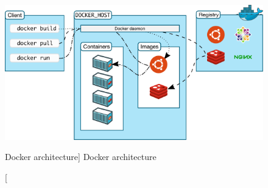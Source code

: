 \begin{figure}[htb]\centering
  \includegraphics[width=1\textwidth]{images/dockerarchitecture.png}
  \caption
    [Docker architecture]
    {Docker architecture \cite{dockerdocs}}
  \label{fig:docker-architecture}
\end{figure}